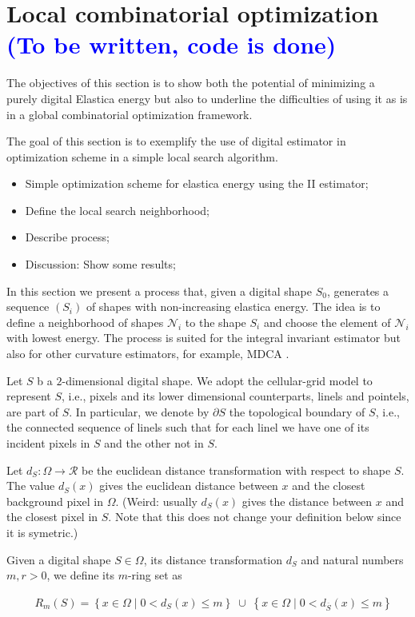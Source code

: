 \documentclass[runningheads]{llncs}
\newcommand{\todo}[1]{{\textcolor{blue}{#1}}}
\newcommand{\jaco}[1]{{\textcolor{green!50!black}{#1}}}
\begin{document}
\section{Local combinatorial optimization \todo{(To be written, code is done)}}

\jaco{The objectives of this section is to show both the potential of minimizing a purely digital Elastica energy but also to underline the difficulties of using it as is in a global combinatorial optimization framework.}

The goal of this section is to exemplify the use of digital estimator
in optimization scheme in a simple local search algorithm.
\begin{itemize}
	\item{Simple optimization scheme for elastica energy using the II estimator;}
	\item{Define the local search neighborhood;}
    \item{Describe process;}	
    \item{Discussion: Show some results; }	
\end{itemize}

\hrulefill

In this section we present a process that, given a digital shape
$S_0$, generates a sequence $(S_i)$ of shapes with non-increasing
elastica energy. The idea is to define a neighborhood \jaco{of shapes}
$\mathcal{N}_i$ \jaco{to the shape} $S_i$ and choose the element of
$\mathcal{N}_i$ with lowest energy.  The process is suited for the
integral invariant estimator but also for other curvature estimators,
for example, MDCA \cite{roussillon11}.

Let $S$ \jaco{b} a $2$-dimensional digital shape. We adopt the cellular-grid model to represent $S$, i.e., pixels and its lower dimensional counterparts, linels and pointels, are part of $S$. In particular, we denote by $\partial S$ the topological boundary of $S$, i.e., the connected sequence of linels such that for each linel we have one of its incident pixels in $S$ and the other not in $S$.


Let $d_{S}:\Omega \rightarrow \mathcal{R}$ be the euclidean distance transformation with respect to shape $S$. The value $d_S(x)$ gives the euclidean distance between $x$ and the closest background pixel in $\Omega$. \jaco{(Weird: usually $d_S(x)$ gives the distance between $x$ and the closest pixel in $S$. Note that this does not change your definition below since it is symetric.)}

\begin{definition}
Given a digital shape $S\in\Omega$, its distance transformation $d_S$ and natural numbers $m,r > 0$, we define its $m$-ring set as

\begin{align*}
	\quad R_m(S) = \left\{ x \in \Omega \; | \; 0 < d_S(x) \leq m \right\} \; \cup \;  \left\{ x \in \Omega \; | \; 	0 < d_{\overline{S}}(x) \leq m \right\}\\
\end{align*}

\end{definition}
\end{document}
